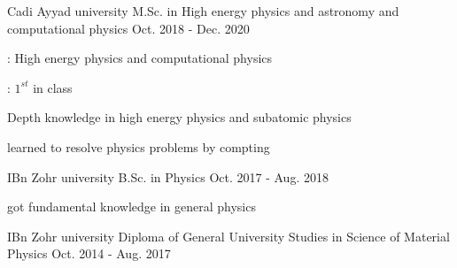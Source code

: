 

\begin{cventries}

  \cventry
    {Cadi Ayyad university} %
        {M.Sc. in High energy physics and astronomy and computational physics } %
    {} %
    {Oct. 2018 - Dec. 2020} %
    {
      \begin{cvitems} %
        \item {:  High energy physics and computational physics}
        \item {: $1^{st}$ in class}
        \item {Depth knowledge in high energy physics and subatomic physics}
        \item {learned  to resolve physics problems by compting }
      \end{cvitems}
    }

      \cventry
    {IBn Zohr university} %
        {B.Sc. in Physics} %
    {} %
    {Oct. 2017 - Aug. 2018} %
    {
      \begin{cvitems} %
        \item {got fundamental knowledge in general  physics}
      \end{cvitems}
    }

          \cventry
    {IBn Zohr university} %
        {Diploma of General University Studies in Science of Material Physics} %
    {} %
    {Oct. 2014 - Aug. 2017} %
    {
    }
    

\end{cventries}
